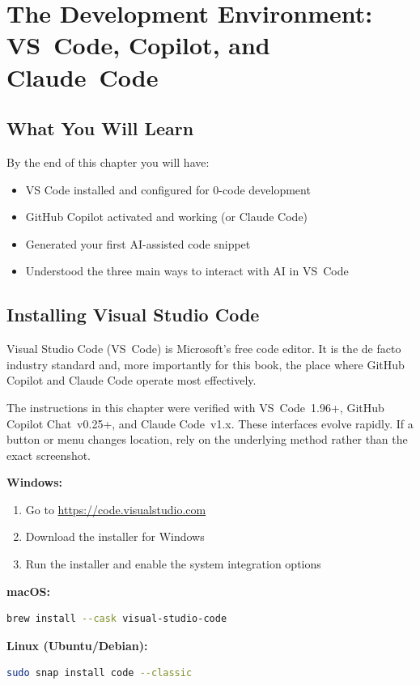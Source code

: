 \chapter{The Development Environment: VS~Code, Copilot, and Claude~Code}

\section*{What You Will Learn}
By the end of this chapter you will have:
\begin{itemize}
  \item VS Code installed and configured for 0-code development
  \item GitHub Copilot activated and working (or Claude Code)
  \item Generated your first AI-assisted code snippet
  \item Understood the three main ways to interact with AI in VS~Code
\end{itemize}

\section{Installing Visual Studio Code}

Visual Studio Code (VS~Code) is Microsoft's free code editor. It is the de facto industry standard and, more importantly for this book, the place where GitHub Copilot and Claude Code operate most effectively.

\begin{versionbox}
The instructions in this chapter were verified with VS~Code~1.96+, GitHub Copilot Chat~v0.25+, and Claude Code~v1.x. These interfaces evolve rapidly. If a button or menu changes location, rely on the underlying method rather than the exact screenshot.
\end{versionbox}

\begin{praticabox}[title={Hands-on --- Installing VS Code}]
\textbf{Windows:}
\begin{enumerate}
  \item Go to \url{https://code.visualstudio.com}
  \item Download the installer for Windows
  \item Run the installer and enable the system integration options
\end{enumerate}

\textbf{macOS:}
\begin{lstlisting}[language=bash]
brew install --cask visual-studio-code
\end{lstlisting}

\textbf{Linux (Ubuntu/Debian):}
\begin{lstlisting}[language=bash]
sudo snap install code --classic
\end{lstlisting}
\end{praticabox}

